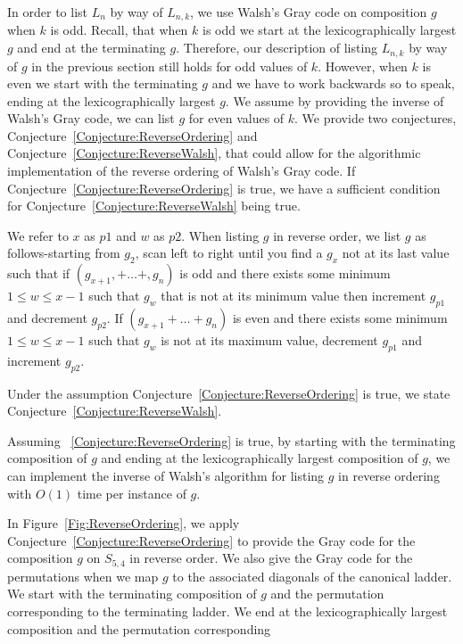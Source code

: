 In order to list $L_{n}$ by way of $L_{n,k}$, we use Walsh's Gray code on composition $g$ when $k$ is odd. Recall, that 
when $k$ is odd we start at the lexicographically largest $g$ and end at the terminating $g$. Therefore, our description of 
listing $L_{n,k}$ by way of $g$ in the previous section still holds for odd values of $k$. However, when $k$ is even we 
start with the terminating $g$ and we have to work backwards so to speak, ending at the lexicographically largest $g$.
We assume by providing the inverse of Walsh's Gray code, we can list $g$ for even values of $k$. 
We provide two conjectures, Conjecture~\ref{Conjecture:ReverseOrdering} and Conjecture~\ref{Conjecture:ReverseWalsh},
that could allow for the algorithmic implementation of the reverse ordering of Walsh's Gray code. If 
Conjecture~\ref{Conjecture:ReverseOrdering} is true, we have a sufficient condition for Conjecture~\ref{Conjecture:ReverseWalsh} being true. 
\begin{conjecture}
  We refer to $x$ as $p1$ and $w$ as $p2$.
  When listing $g$ in reverse order, we list $g$ as follows-starting from $g_{2}$, 
  scan left to right until you find a $g_{x}$ not at its last value such that if $(g_{x+1}, + \dots + ,g_{n})$ is odd and there exists some minimum $1 \leq w \leq x-1$ 
  such that $g_{w}$ that is not at its minimum value then increment $g_{p1}$ and decrement $g_{p2}$. If $(g_{x+1} + \dots +g_{n})$ is even and there 
  exists some minimum $1 \leq w \leq x-1$ such that $g_{w}$ is not at its maximum value, decrement $g_{p1}$ and increment $g_{p2}$. 
  \label{Conjecture:ReverseOrdering}
\end{conjecture}
Under the assumption Conjecture~\ref{Conjecture:ReverseOrdering} is true, we state Conjecture~\ref{Conjecture:ReverseWalsh}.
\begin{conjecture}
  Assuming ~\ref{Conjecture:ReverseOrdering} is true, by starting with the terminating composition of $g$ and ending at the 
  lexicographically largest composition of $g$, we  
  can implement the inverse of Walsh's algorithm for listing $g$ in reverse ordering with $O(1)$ time per instance of $g$. 
  \label{Conjecture:ReverseWalsh}
\end{conjecture}
In Figure~\ref{Fig:ReverseOrdering}, we apply Conjecture~\ref{Conjecture:ReverseOrdering}
to provide the Gray code for the composition $g$ on $S_{5,4}$ in reverse order. We also give
 the Gray code for the permutations when we map $g$ to the associated diagonals of the canonical ladder. 
We start with the terminating composition of $g$ 
and the permutation corresponding to the terminating ladder. We end at the lexicographically largest composition and the permutation corresponding 
